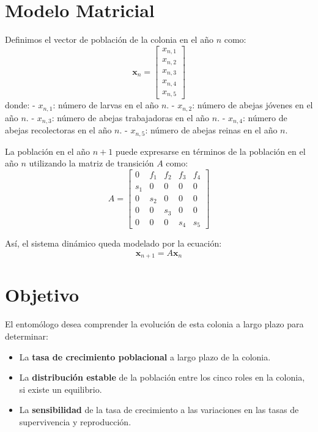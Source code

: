 \documentclass{article}
\begin{document}
\section*{Modelo Matricial}

Definimos el vector de población de la colonia en el año \( n \) como:
\[
\mathbf{x}_n = \begin{bmatrix} x_{n,1} \\ x_{n,2} \\ x_{n,3} \\ x_{n,4} \\ x_{n,5} \end{bmatrix}
\]
donde:
- \( x_{n,1} \): número de larvas en el año \( n \).
- \( x_{n,2} \): número de abejas jóvenes en el año \( n \).
- \( x_{n,3} \): número de abejas trabajadoras en el año \( n \).
- \( x_{n,4} \): número de abejas recolectoras en el año \( n \).
- \( x_{n,5} \): número de abejas reinas en el año \( n \).

La población en el año \( n+1 \) puede expresarse en términos de la población en el año \( n \) utilizando la matriz de transición \( A \) como:
\[
A = \begin{bmatrix} 0 & f_1 & f_2 & f_3 & f_4 \\ s_1 & 0 & 0 & 0 & 0 \\ 0 & s_2 & 0 & 0 & 0 \\ 0 & 0 & s_3 & 0 & 0 \\ 0 & 0 & 0 & s_4 & s_5 \end{bmatrix}
\]

Así, el sistema dinámico queda modelado por la ecuación:
\[
\mathbf{x}_{n+1} = A \mathbf{x}_n
\]

\section*{Objetivo}

El entomólogo desea comprender la evolución de esta colonia a largo plazo para determinar:
\begin{itemize}
    \item La \textbf{tasa de crecimiento poblacional} a largo plazo de la colonia.
    \item La \textbf{distribución estable} de la población entre los cinco roles en la colonia, si existe un equilibrio.
    \item La \textbf{sensibilidad} de la tasa de crecimiento a las variaciones en las tasas de supervivencia y reproducción.
\end{itemize}
\end{document}
